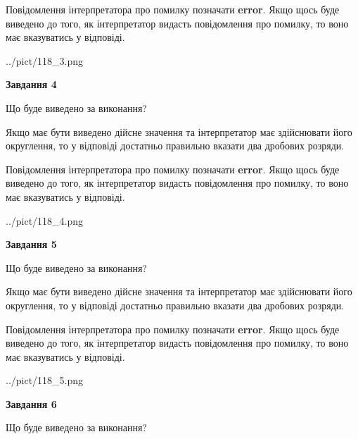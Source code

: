 \documentclass[12pt, ukrainian]{article}
\begin{document}
{\begin {Large}
Повідомлення інтерпретатора про помилку позначати \textbf{error}.
Якщо щось буде виведено до того, як інтерпретатор видасть повідомлення про помилку, 
то воно має вказуватись у відповіді. \par

\begin{center}
	{../pict/118_3.png}
\end{center}
\newpage

{\begin {center}\textbf{Завдання 4}\end {center}}\par
Що буде виведено за виконання? \par

Якщо має бути виведено дійсне значення та інтерпретатор має здійснювати його округлення, 
то у відповіді достатньо правильно вказати два дробових розряди.

Повідомлення інтерпретатора про помилку позначати \textbf{error}.
Якщо щось буде виведено до того, як інтерпретатор видасть повідомлення про помилку, 
то воно має вказуватись у відповіді. \par

\begin{center}
	{../pict/118_4.png}
\end{center}
\newpage

{\begin {center}\textbf{Завдання 5}\end {center}}\par
Що буде виведено за виконання? \par

Якщо має бути виведено дійсне значення та інтерпретатор має здійснювати його округлення, 
то у відповіді достатньо правильно вказати два дробових розряди.

Повідомлення інтерпретатора про помилку позначати \textbf{error}.
Якщо щось буде виведено до того, як інтерпретатор видасть повідомлення про помилку, 
то воно має вказуватись у відповіді. \par

\begin{center}
	{../pict/118_5.png}
\end{center}
\newpage

{\begin {center}\textbf{Завдання 6}\end {center}}\par
Що буде виведено за виконання? \par


\end{Large}}
\end{document}
